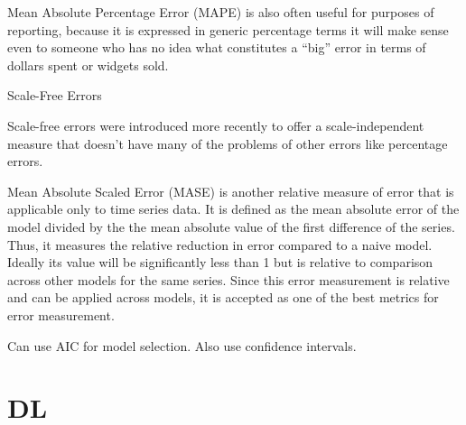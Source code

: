 \documentclass[]{book}
\theoremstyle{definition}
\theoremstyle{definition}
\theoremstyle{definition}
\theoremstyle{remark}
\begin{document}
Mean Absolute Percentage Error (MAPE) is also often useful for purposes
of reporting, because it is expressed in generic percentage terms it
will make sense even to someone who has no idea what constitutes a
``big'' error in terms of dollars spent or widgets sold.

Scale-Free Errors

Scale-free errors were introduced more recently to offer a
scale-independent measure that doesn't have many of the problems of
other errors like percentage errors.

Mean Absolute Scaled Error (MASE) is another relative measure of error
that is applicable only to time series data. It is defined as the mean
absolute error of the model divided by the the mean absolute value of
the first difference of the series. Thus, it measures the relative
reduction in error compared to a naive model. Ideally its value will be
significantly less than 1 but is relative to comparison across other
models for the same series. Since this error measurement is relative and
can be applied across models, it is accepted as one of the best metrics
for error measurement.

Can use AIC for model selection. Also use confidence intervals.

\section{DL}\label{dl}
\end{document}

